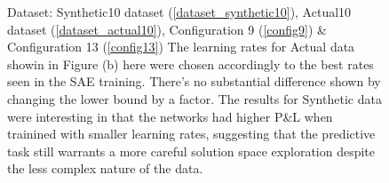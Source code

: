 \documentclass[a4paper,11pt,oneside]{article}
\theoremstyle{plain}
\theoremstyle{definition}
\begin{document}
\begin{figure}[H]
\begin{subfigure}{.5\textwidth}
{				\newline }
			\label{figure-actual_pl_minmax_lr}
		\end{subfigure}
		\caption[P\&L by Learning Rates]{Dataset: Synthetic10 dataset (\ref{dataset_synthetic10}), Actual10 dataset (\ref{dataset_actual10}), Configuration 9 (\ref{config9}) \& Configuration 13 (\ref{config13})
			\newline The learning rates for Actual data showin in Figure (b) here were chosen accordingly to the best rates seen in the SAE training. There's no substantial difference shown by changing the lower bound by a factor. The results for Synthetic data were interesting in that the networks had higher P\&L when trainined with smaller learning rates, suggesting that the predictive task still warrants a more careful solution space exploration despite the less complex nature of the data.}
		\label{figure-pl_lr}
	\end{figure}
	
\end{document}
